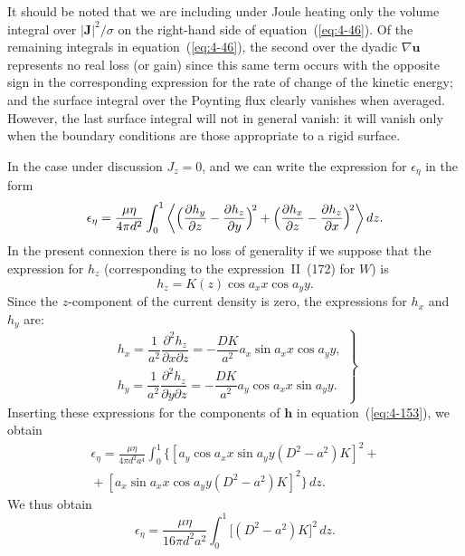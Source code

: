 It should be noted that we are including under Joule heating only the volume integral over $|\mathbf{J}|^2/\sigma$ on the right-hand side of equation~(\ref{eq:4-46}). Of the remaining integrals in equation~(\ref{eq:4-46}), the second over the dyadic $\nabla\mathbf{u}$ represents no real loss (or gain) since this same term occurs with the opposite sign in the corresponding expression for the rate of change of the kinetic energy; and the surface integral over the Poynting flux clearly vanishes when averaged. However, the last surface integral will not in general vanish: it will vanish only when the boundary conditions are those appropriate to a rigid surface.

In the case under discussion $J_z=0$, and we can write the expression for $\epsilon_\eta$ in the form
\begin{equation}
\label{eq:4-153}
\epsilon_\eta = \frac{\mu\eta}{4\pi d^2}\int_0^1\left\langle\Bigl(\frac{\partial h_y}{\partial z}-\frac{\partial h_z}{\partial y}\Bigr)^{\!2}+\Bigl(\frac{\partial h_x}{\partial z}-\frac{\partial h_z}{\partial x}\Bigr)^{\!2}\right\rangle dz.
\end{equation}
In the present connexion there is no loss of generality if we suppose that the expression for $h_z$ (corresponding to the expression~II~(172) for $W$) is
\begin{equation}
\label{eq:4-154}
h_z = K(z)\cos a_x x\cos a_y y.
\end{equation}
Since the $z$-component of the current density is zero, the expressions for $h_x$ and $h_y$ are:
\begin{equation}
\label{eq:4-155}
\left.\begin{array}{l}
h_x = \dfrac{1}{a^2}\dfrac{\partial^2 h_z}{\partial x\partial z} = -\dfrac{DK}{a^2}a_x\sin a_x x\cos a_y y, \\[8pt]
h_y = \dfrac{1}{a^2}\dfrac{\partial^2 h_z}{\partial y\partial z} = -\dfrac{DK}{a^2}a_y\cos a_x x\sin a_y y.
\end{array}\right\}
\end{equation}
Inserting these expressions for the components of $\mathbf{h}$ in equation~(\ref{eq:4-153}), we obtain
\begin{multline}
\label{eq:4-156}
\epsilon_\eta = \frac{\mu\eta}{4\pi d^2 a^4}\int_0^1\bigl\{[a_y\cos a_x x\sin a_y y(D^2-a^2)K]^2 + {} \\
{} + [a_x\sin a_x x\cos a_y y(D^2-a^2)K]^2\bigr\}\,dz.
\end{multline}
We thus obtain
\begin{equation}
\label{eq:4-157}
\epsilon_\eta = \frac{\mu\eta}{16\pi d^2 a^2}\int_0^1 \bigl[(D^2-a^2)K\bigr]^2\,dz.
\end{equation}

